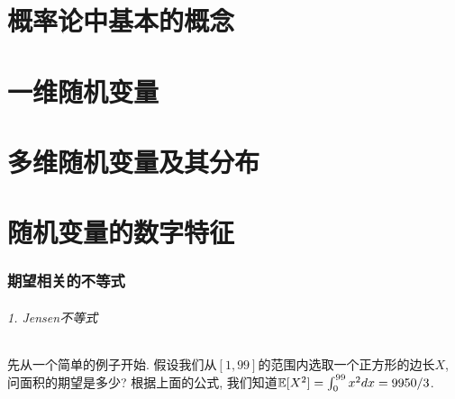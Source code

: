 
\usepackage{ctex}
\usepackage{pifont}
\usepackage{cleveref}
\usepackage{pstricks}
\usepackage{pgfplots}





\part{概率论中基本的概念}


\begin{shaded}
    
\end{shaded}


\begin{shaded}
    
\end{shaded}

\part{一维随机变量}





\part{多维随机变量及其分布}





\part{随机变量的数字特征}



\section{期望相关的不等式}

\paragraph{1. Jensen不等式} 先从一个简单的例子开始. 假设我们从$[1,99]$的范围内选取一个正方形的边长$X$, 问面积的期望是多少? 根据上面的公式, 我们知道$\mathbb E[X^2]= \int_{0}^{99} x^2 dx = 9950/3$. 

